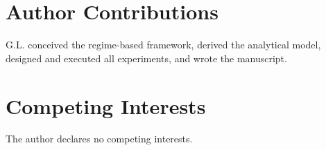 \documentclass[
    Numbered,         %
]{sn-jnl}
\begin{document}













\section*{Author Contributions}
G.L. conceived the regime-based framework, derived the analytical model,
designed and executed all experiments, and wrote the manuscript.

\section*{Competing Interests}
The author declares no competing interests.






\end{document}
